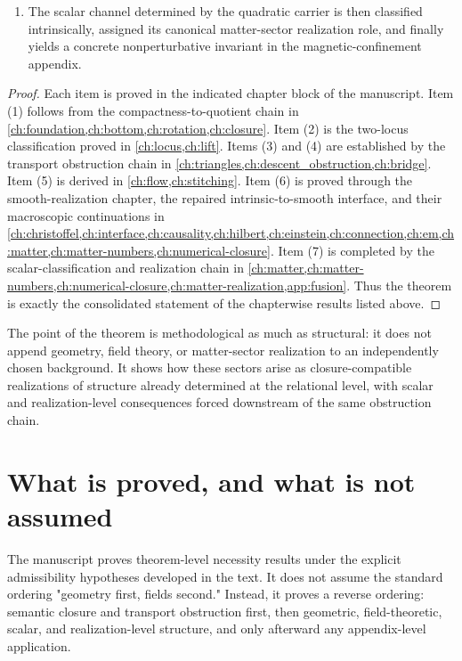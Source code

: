 \begin{theorem}
\begin{enumerate}[label=\textup{(\arabic*)}]
		      \(2\), and faithful smooth realization on that forced carrier makes a
		      nonzero stabilized square class equivalent to nonzero realized
		      curvature on the realized degree--\(2\) channel.  This
		      degree--\(2\) realized-channel package feeds causal, Hilbert,
		      Einstein-boundary, connection, electromagnetic, matter-sector, and
		      numerical-closure consequences.
		\item
		      The scalar channel determined by the quadratic carrier is then
		      classified intrinsically, assigned its canonical matter-sector
		      realization role, and finally yields a concrete nonperturbative
		      invariant in the magnetic-confinement appendix.
	\end{enumerate}
\end{theorem}
\begin{proof}
	Each item is proved in the indicated chapter block of the manuscript.
	Item \textup{(1)} follows from the compactness-to-quotient chain in
	\cref{ch:foundation,ch:bottom,ch:rotation,ch:closure}.
	Item \textup{(2)} is the two-locus classification proved in
	\cref{ch:locus,ch:lift}.
	Items \textup{(3)} and \textup{(4)} are established by the transport
	obstruction chain in
	\cref{ch:triangles,ch:descent_obstruction,ch:bridge}.
		Item \textup{(5)} is derived in
		\cref{ch:flow,ch:stitching}.
		Item \textup{(6)} is proved through the smooth-realization chapter, the
		repaired intrinsic-to-smooth interface, and their macroscopic
		continuations in
		\cref{ch:christoffel,ch:interface,ch:causality,ch:hilbert,ch:einstein,ch:connection,ch:em,ch:matter,ch:matter-numbers,ch:numerical-closure}.
		Item \textup{(7)} is completed by the scalar-classification and
		realization chain in
		\cref{ch:matter,ch:matter-numbers,ch:numerical-closure,ch:matter-realization,app:fusion}.
		Thus the theorem is exactly the consolidated statement of the chapterwise
		results listed above.
\end{proof}

The point of the theorem is methodological as much as structural:
it does not append geometry, field theory, or matter-sector realization
to an independently chosen background.
It shows how these sectors arise as closure-compatible realizations of
structure already determined at the relational level, with scalar and
realization-level consequences forced downstream of the same
obstruction chain.

\section{What is proved, and what is not assumed}
The manuscript proves theorem-level necessity results under the
explicit admissibility hypotheses developed in the text.
It does not assume the standard ordering
"geometry first, fields second."
Instead, it proves a reverse ordering:
semantic closure and transport obstruction first, then geometric,
field-theoretic, scalar, and realization-level structure, and only
afterward any appendix-level application.

